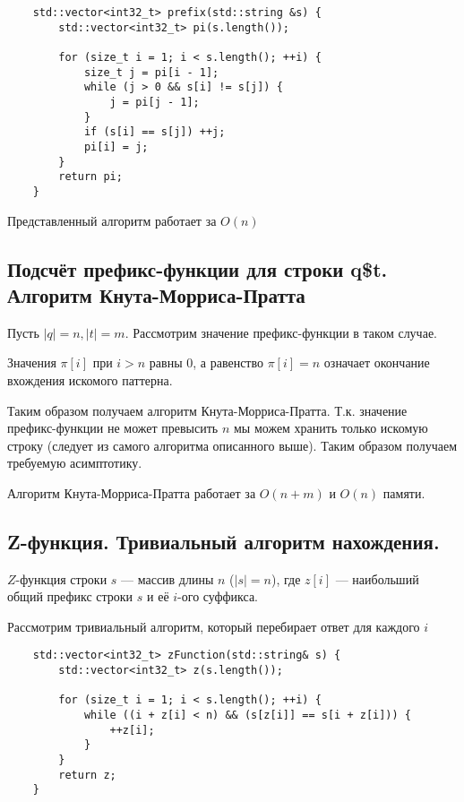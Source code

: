 \begin{lstlisting}
	std::vector<int32_t> prefix(std::string &s) {
		std::vector<int32_t> pi(s.length());

		for (size_t i = 1; i < s.length(); ++i) {
			size_t j = pi[i - 1];
			while (j > 0 && s[i] != s[j]) {
				j = pi[j - 1];
			}
			if (s[i] == s[j]) ++j;
			pi[i] = j;
		}
		return pi;
	}
\end{lstlisting}

\begin{remark}
	Представленный алгоритм работает за $O(n)$
\end{remark}

\subsection{Подсчёт префикс-функции для строки q\$t. Алгоритм Кнута-Морриса-Пратта}

Пусть $\left| q \right| = n, \left| t \right| = m$. Рассмотрим значение префикс-функции в таком случае.

\begin{remark}
	Значения $\pi [i]$ при $i > n$ равны $0$, а равенство $\pi[i] = n$ означает окончание вхождения искомого
	паттерна.
\end{remark}

Таким образом получаем алгоритм Кнута-Морриса-Пратта. Т.к. значение префикс-функции не может превысить $n$ мы
можем хранить только искомую строку (следует из самого алгоритма описанного выше). Таким образом получаем требуемую асимптотику.

\begin{remark}
	Алгоритм Кнута-Морриса-Пратта работает за $O(n+m)$ и $O(n)$ памяти.
\end{remark}

\subsection{Z-функция. Тривиальный алгоритм нахождения.}

\begin{definition}
	$Z$-функция строки $s$ --- массив длины $n$ ($\left| s \right| = n$), где $z[i]$ --- наибольший общий
	префикс строки $s$ и её $i$-ого суффикса.
\end{definition}

Рассмотрим тривиальный алгоритм, который перебирает ответ для каждого $i$

\begin{lstlisting}
	std::vector<int32_t> zFunction(std::string& s) {
		std::vector<int32_t> z(s.length());

		for (size_t i = 1; i < s.length(); ++i) {
			while ((i + z[i] < n) && (s[z[i]] == s[i + z[i])) {
				++z[i];
			}
		}
		return z;
	}
\end{lstlisting}

